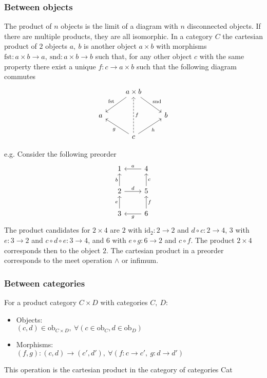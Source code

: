 \subsubsection*{Between objects}
The product of $n$ objects is the limit of a diagram with $n$ disconnected
objects. \cite{nlab:cartesian_product} If there are multiple products, they are all isomorphic.
In a category $C$ the cartesian product of $2$ objects $a,\ b$ is another
object $a\times b$ with morphisms $\mathrm{fst}: a\times b \to a,
\ \mathrm{snd}: a\times b \to b$ such that, for any other object $c$ with the
same property there exist a unique $f:c \to a\times b$ such that the following
diagram commutes
\[\begin{tikzcd}
	& {a\times b} \\
	a && b \\
	& c
	\arrow["{\mathrm{fst}}"', from=1-2, to=2-1]
	\arrow["{\mathrm{snd}}", from=1-2, to=2-3]
	\arrow["f"', dashed, from=3-2, to=1-2]
	\arrow["g", from=3-2, to=2-1]
	\arrow["h"', from=3-2, to=2-3]
\end{tikzcd}\]

e.g.
Consider the following preorder
\[\begin{tikzcd}
	1 & 4 \\
	2 & 5 \\
	3 & 6
	\arrow["g", from=3-2, to=3-1]
	\arrow["f"', from=3-2, to=2-2]
	\arrow["c"', from=2-2, to=1-2]
	\arrow["e", from=3-1, to=2-1]
	\arrow["b", from=2-1, to=1-1]
	\arrow["a"', from=1-2, to=1-1]
	\arrow["d", from=2-1, to=2-2]
\end{tikzcd}\]
The product candidates for $2\times 4$ are $2$ with $\mathrm{id}_2 : 2\to 2$
and $d\circ c:2\to 4$, $3$ with $e: 3\to 2$ and $c\circ d\circ e: 3\to 4$,
and $6$ with $e \circ g: 6\to 2$ and $c\circ f$. The product $2\times 4$
corresponds then to the object $2$. The cartesian product in a
preorder corresponds to the meet operation $\land$ or infimum.
\cite{7sketches_compositionality}

\subsubsection*{Between categories}
For a product category $C\times D$ with categories $C,\ D$:
\cite{nlab:product_category}
\begin{itemize}
  \item Objects:\\
    $(c, d) \in \mathrm{ob}_{C\times D},\ \forall (c \in \mathrm{ob}_C, d \in \mathrm{ob}_D)$
  \item Morphisms:\\
    $(f,g) : (c,d) \to (c', d'),\ \forall (f: c \to c',\ g:d \to d')$
\end{itemize}
This operation is the cartesian product in the category of categories Cat


